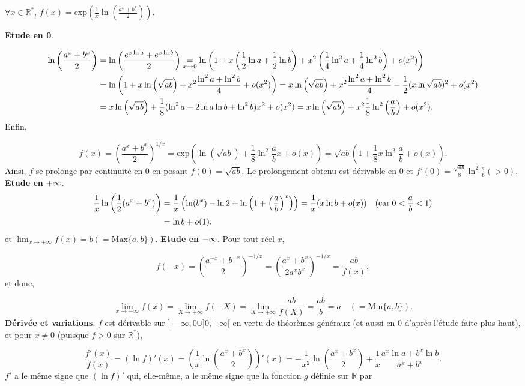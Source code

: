 \documentclass[11pt,a4paper]{article}
\newcommand{\Rr}{\mathbb{R}} \newcommand{\R}{\mathbb{R}}
\begin{document}
\begin{center}
$\forall x\in\Rr^*$, $f(x)=\text{exp}\left(\frac{1}{x}\ln\left(\frac{a^x+b^x}{2}\right)\right)$.
\end{center}
\textbf{Etude en 0}.

\begin{align*}\ensuremath
\ln\left(\frac{a^x+b^x}{2}\right)&=\ln\left(\frac{e^{x\ln a}+e^{x\ln b}}{2}\right)\underset{x\rightarrow0}{=}\ln\left(1+x\left(\frac{1}{2}\ln a+\frac{1}{2}\ln b\right)+x^2\left(\frac{1}{4}\ln^2a+\frac{1}{4}\ln^2b\right)+o(x^2)\right)\\
 &=\ln\left(1+x\ln\left(\sqrt{ab}\right)+x^2\frac{\ln^2a+\ln^2b}{4}+o(x^2)\right)=x\ln\left(\sqrt{ab}\right)+x^2\frac{\ln^2a+\ln^2b}{4}-\frac{1}{2}(x\ln\sqrt{ab})^2+o(x^2)\\
 &=x\ln\left(\sqrt{ab}\right)+\frac{1}{8}(\ln^2a-2\ln a\ln b+\ln^2b)x^2+o(x^2)=x\ln\left(\sqrt{ab}\right)+x^2\frac{1}{8}\ln^2\left(\frac{a}{b}\right)+o(x^2).
\end{align*}
Enfin,

$$f(x)=\left(\frac{a^x+b^x}{2}\right)^{1/x}=\mbox{exp}(\ln(\sqrt{ab})+\frac{1}{8}\ln^2\frac{a}{b}x+o(x))=\sqrt{ab}(1+\frac{1}{8}x\ln^2\frac{a}{b}+o(x)).$$
Ainsi, $f$ se prolonge par continuité en $0$ en posant $f(0)=\sqrt{ab}$. Le prolongement obtenu est dérivable en $0$ et
$f'(0)=\frac{\sqrt{ab}}{8}\ln^2\frac{a}{b}(>0)$.
\textbf{Etude en} $\bf{+\infty}$.
\begin{align*}\ensuremath
\frac{1}{x}\ln\left(\frac{1}{2}(a^x+b^x)\right)&=\frac{1}{x}\left(\ln(b^x)-\ln2+\ln\left(1+\left(\frac{a}{b}\right)^x\right)\right)
=\frac{1}{x}(x\ln b+o(x))\quad(\mbox{car}\;0<\frac{a}{b}<1)\\
 &=\ln b+o(1).
\end{align*}
et $\lim_{x\rightarrow +\infty}f(x)=b(=\mbox{Max}\{a,b\})$.
\textbf{Etude en} $\bf{-\infty}$. Pour tout réel $x$,

$$f(-x)=\left(\frac{a^{-x}+b^{-x}}{2}\right)^{-1/x}= \left(\frac{a^{x}+b^{x}}{2a^xb^x}\right)^{-1/x}=\frac{ab}{f(x)},$$
et donc,

$$\lim_{x\rightarrow -\infty}f(x)=\lim_{X\rightarrow +\infty}f(-X)=\lim_{X\rightarrow +\infty}\frac{ab}{f(X)}=\frac{ab}{b}=a\quad(=\mbox{Min}\{a,b\}).$$
\textbf{Dérivée et variations}.
$f$ est dérivable sur $]-\infty,0\cup]0,+\infty[$ en vertu de théorèmes généraux (et aussi en $0$ d'après l'étude faite plus haut), et pour $x\neq0$ (puisque $f>0$ sur $\Rr^*$),

$$\frac{f'(x)}{f(x)}=(\ln f)'(x)=\left(\frac{1}{x}\ln\left(\frac{a^x+b^x}{2}\right)\right)'(x)=-\frac{1}{x^2}\ln\left(\frac{a^x+b^x}{2}\right)+\frac{1}{x}
\frac{a^x\ln a+b^x\ln b}{a^x+b^x}.$$
$f'$ a le même signe que $(\ln f)'$ qui, elle-même, a le même signe que la fonction $g$ définie sur $\Rr$ par
\end{document}
